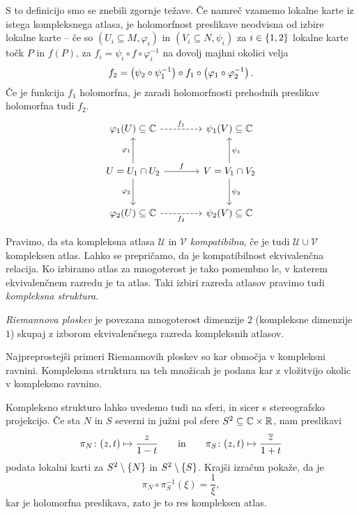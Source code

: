 S to definicijo smo se znebili zgornje težave. Če namreč vzamemo
lokalne karte iz istega kompleksnega atlasa, je holomorfnost
preslikave neodvisna od izbire lokalne karte -- če so
$(U_i \subseteq M, \varphi_i)$ in $(V_i \subseteq N, \psi_i)$
za $i \in \left\{1, 2\right\}$ lokalne karte točk $P$ in $f(P)$, za
$f_i = \psi_i \circ f \circ \varphi_i^{-1}$ na dovolj majhni
okolici velja
\[
f_2 = \left(\psi_2 \circ \psi_1^{-1}\right) \circ
f_1 \circ \left(\varphi_1 \circ \varphi_2^{-1}\right).
\]
Če je funkcija $f_1$ holomorfna, je zaradi holomorfnosti prehodnih
preslikav holomorfna tudi $f_2$.
\[
\begin{tikzcd}[column sep=large, row sep=large]
\varphi_1(U) \subseteq \C \arrow[r, dashrightarrow, "f_1"] &
\psi_1(V) \subseteq \C
\\
U = U_1 \cap U_2
\arrow[r, "f"] \arrow[d, "\varphi_2"'] \arrow[u, "\varphi_1"] &
V = V_1 \cap V_2
\arrow[u, "\psi_1"'] \arrow[d, "\psi_2"] \\
\varphi_2(U) \subseteq \C \arrow[r, dashrightarrow, "f_2"'] &
\psi_2(V) \subseteq \C
\end{tikzcd}
\]

Pravimo, da sta kompleksna atlasa $\mathcal{U}$ in $\mathcal{V}$
\emph{kompatibilna}, če je tudi $\mathcal{U} \cup \mathcal{V}$
kompleksen atlas. Lahko se prepričamo, da je kompatibilnost
ekvivalenčna relacija. Ko izbiramo atlas za mnogoterost je tako
pomembno le, v katerem ekvivalenčnem razredu je ta atlas. Taki
izbiri razreda atlasov pravimo tudi \emph{kompleksna struktura}.

\begin{definicija}
\emph{Riemannova ploskev} je povezana mnogoterost dimenzije $2$
(kompleksne dimenzije $1$) skupaj z izborom ekvivalenčnega razreda
kompleksnih atlasov.
\end{definicija}

\begin{zgled}
Najpreprostejši primeri Riemannovih ploskev so kar območja v
kompleksni ravnini. Kompleksna struktura na teh množicah je podana
kar z vložitvijo okolic v kompleksno ravnino.

Kompleksno strukturo lahko uvedemo tudi na sferi, in sicer s
stereografsko projekcijo. Če sta $N$ in $S$ severni in južni pol
sfere $S^2 \subseteq \mathbb{C} \times \mathbb{R}$, nam preslikavi
\[
\pi_N \colon (z, t) \mapsto \frac{z}{1-t}
\qquad \text{in} \qquad
\pi_S \colon (z, t) \mapsto \frac{\overline{z}}{1+t}
\]
podata lokalni karti za $S^2 \setminus \left\{N\right\}$ in
$S^2 \setminus \left\{S\right\}$. Krajši izračun pokaže, da je
\[
\pi_N \circ \pi_S^{-1}(\xi) = \frac{1}{\xi},
\]
kar je holomorfna preslikava, zato je to res kompleksen atlas.
\end{zgled}

